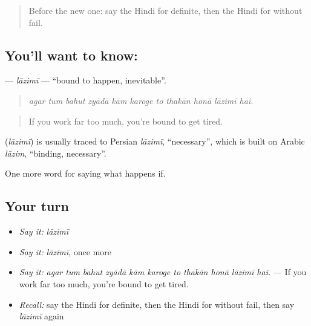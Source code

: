 \label{lesson:HI-C376-lazimi}



\begin{quote}
Before the new one: say the Hindi for definite, then the Hindi for without fail.
\end{quote}

\subsection*{You'll want to know: }
\textbf{} — \emph{lāzimī} — \textquotedblleft{}bound to happen, inevitable\textquotedblright{}.

\begin{quote}
          
\end{quote}

\begin{quote}
\emph{agar tum bahut zyādā kām karoge to thakān honā lāzimī hai.}
\end{quote}

\begin{quote}
If you work far too much, you're bound to get tired.
\end{quote}

\begin{cousinweb}
\textbf{} (\emph{lāzimī}) is usually traced to Persian \emph{lāzimī}, \textquotedblleft{}necessary\textquotedblright{}, which is built on Arabic \emph{lāzim}, \textquotedblleft{}binding, necessary\textquotedblright{}.
\end{cousinweb}

\begin{grammarlens}[title={What you've built}]
One more word for saying what happens if.
\end{grammarlens}

\subsection*{Your turn}
\begin{itemize}
\raggedright
  \item \emph{Say it:} \emph{lāzimī}
  \item \emph{Say it:} \emph{lāzimī}, once more
  \item \emph{Say it:} \emph{agar tum bahut zyādā kām karoge to thakān honā lāzimī hai.} — If you work far too much, you're bound to get tired.
  \item \emph{Recall:} say the Hindi for definite, then the Hindi for without fail, then say \emph{lāzimī} again
\end{itemize}

